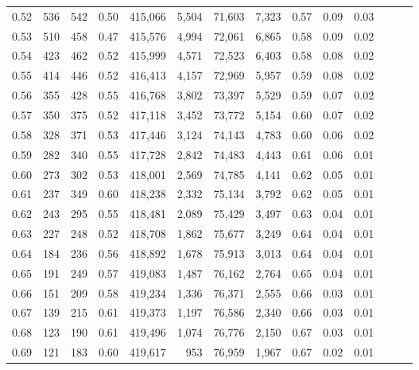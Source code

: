 \begin{tabular}{rrrrrrrrrrrrrr}
0.52 &     536 &    542 &  0.50 &  415,066 &    5,504 &  71,603 &   7,323 &  0.57 &  0.09 &      0.03 \\
0.53 &     510 &    458 &  0.47 &  415,576 &    4,994 &  72,061 &   6,865 &  0.58 &  0.09 &      0.02 \\
0.54 &     423 &    462 &  0.52 &  415,999 &    4,571 &  72,523 &   6,403 &  0.58 &  0.08 &      0.02 \\
0.55 &     414 &    446 &  0.52 &  416,413 &    4,157 &  72,969 &   5,957 &  0.59 &  0.08 &      0.02 \\
0.56 &     355 &    428 &  0.55 &  416,768 &    3,802 &  73,397 &   5,529 &  0.59 &  0.07 &      0.02 \\
0.57 &     350 &    375 &  0.52 &  417,118 &    3,452 &  73,772 &   5,154 &  0.60 &  0.07 &      0.02 \\
0.58 &     328 &    371 &  0.53 &  417,446 &    3,124 &  74,143 &   4,783 &  0.60 &  0.06 &      0.02 \\
0.59 &     282 &    340 &  0.55 &  417,728 &    2,842 &  74,483 &   4,443 &  0.61 &  0.06 &      0.01 \\
0.60 &     273 &    302 &  0.53 &  418,001 &    2,569 &  74,785 &   4,141 &  0.62 &  0.05 &      0.01 \\
0.61 &     237 &    349 &  0.60 &  418,238 &    2,332 &  75,134 &   3,792 &  0.62 &  0.05 &      0.01 \\
0.62 &     243 &    295 &  0.55 &  418,481 &    2,089 &  75,429 &   3,497 &  0.63 &  0.04 &      0.01 \\
0.63 &     227 &    248 &  0.52 &  418,708 &    1,862 &  75,677 &   3,249 &  0.64 &  0.04 &      0.01 \\
0.64 &     184 &    236 &  0.56 &  418,892 &    1,678 &  75,913 &   3,013 &  0.64 &  0.04 &      0.01 \\
0.65 &     191 &    249 &  0.57 &  419,083 &    1,487 &  76,162 &   2,764 &  0.65 &  0.04 &      0.01 \\
0.66 &     151 &    209 &  0.58 &  419,234 &    1,336 &  76,371 &   2,555 &  0.66 &  0.03 &      0.01 \\
0.67 &     139 &    215 &  0.61 &  419,373 &    1,197 &  76,586 &   2,340 &  0.66 &  0.03 &      0.01 \\
0.68 &     123 &    190 &  0.61 &  419,496 &    1,074 &  76,776 &   2,150 &  0.67 &  0.03 &      0.01 \\
0.69 &     121 &    183 &  0.60 &  419,617 &      953 &  76,959 &   1,967 &  0.67 &  0.02 &      0.01 \\

\end{tabular}
